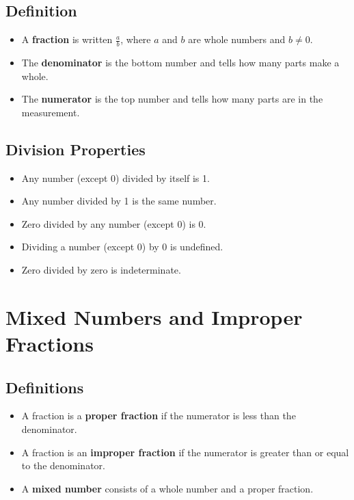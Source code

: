 \documentclass[12pt,twoside]{article}
\begin{document}
\subsection*{Definition}
\begin{itemize}\setlength{\itemsep}{-\parsep}
  \item A \textbf{fraction} is written $\frac{a}{b}$, where $a$ and $b$ are whole numbers and $b \neq 0$.
  \item The \textbf{denominator} is the bottom number and tells how many parts make a whole.
  \item The \textbf{numerator} is the top number and tells how many parts are in the measurement.
\end{itemize}

\subsection*{Division Properties}
\begin{itemize}\setlength{\itemsep}{-\parsep}
  \item Any number (except 0) divided by itself is 1.
  \item Any number divided by 1 is the same number.
  \item Zero divided by any number (except 0) is 0.
  \item Dividing a number (except 0) by 0 is undefined.
  \item Zero divided by zero is indeterminate.
\end{itemize}

\section*{Mixed Numbers and Improper Fractions}

\subsection*{Definitions}

\begin{itemize}\setlength{\itemsep}{-\parsep}
  \item A fraction is a \textbf{proper fraction} if the numerator is less than the denominator.
  \item A fraction is an \textbf{improper fraction} if the numerator is greater than or equal to the denominator.
  \item A \textbf{mixed number} consists of a whole number and a proper fraction.
\end{itemize}
\end{document}
